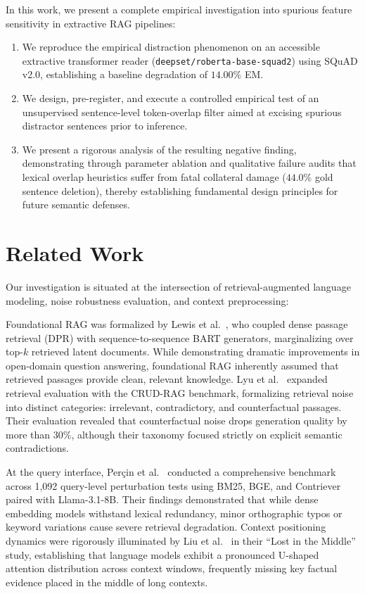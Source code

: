 \documentclass[conference]{IEEEtran}
\begin{document}
In this work, we present a complete empirical investigation into spurious feature sensitivity in extractive RAG pipelines:
\begin{enumerate}
    \item We reproduce the empirical distraction phenomenon on an accessible extractive transformer reader (\texttt{deepset/roberta-base-squad2}) using SQuAD v2.0, establishing a baseline degradation of $14.00\%$ EM.
    \item We design, pre-register, and execute a controlled empirical test of an unsupervised sentence-level token-overlap filter aimed at excising spurious distractor sentences prior to inference.
    \item We present a rigorous analysis of the resulting negative finding, demonstrating through parameter ablation and qualitative failure audits that lexical overlap heuristics suffer from fatal collateral damage ($44.0\%$ gold sentence deletion), thereby establishing fundamental design principles for future semantic defenses.
\end{enumerate}

\section{Related Work}
Our investigation is situated at the intersection of retrieval-augmented language modeling, noise robustness evaluation, and context preprocessing:

Foundational RAG was formalized by Lewis et al.~\cite{lewis2020rag}, who coupled dense passage retrieval (DPR) with sequence-to-sequence BART generators, marginalizing over top-$k$ retrieved latent documents. While demonstrating dramatic improvements in open-domain question answering, foundational RAG inherently assumed that retrieved passages provide clean, relevant knowledge. Lyu et al.~\cite{lyu2024crud} expanded retrieval evaluation with the CRUD-RAG benchmark, formalizing retrieval noise into distinct categories: irrelevant, contradictory, and counterfactual passages. Their evaluation revealed that counterfactual noise drops generation quality by more than $30\%$, although their taxonomy focused strictly on explicit semantic contradictions.

At the query interface, Per\c{c}in et al.~\cite{percin2025robustness} conducted a comprehensive benchmark across 1,092 query-level perturbation tests using BM25, BGE, and Contriever paired with Llama-3.1-8B. Their findings demonstrated that while dense embedding models withstand lexical redundancy, minor orthographic typos or keyword variations cause severe retrieval degradation. Context positioning dynamics were rigorously illuminated by Liu et al.~\cite{liu2024lost} in their ``Lost in the Middle'' study, establishing that language models exhibit a pronounced U-shaped attention distribution across context windows, frequently missing key factual evidence placed in the middle of long contexts.
\end{document}
